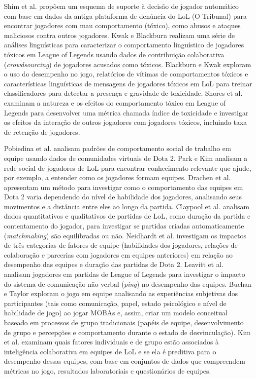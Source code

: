 Shim et al. \cite{shim2014decision} propõem um esquema de suporte à decisão de jogador automático com base em dados da antiga plataforma de denúncia do LoL (O Tribunal) para encontrar jogadores com mau comportamento (tóxico), como abusos e ataques maliciosos contra outros jogadores. Kwak e Blackburn \cite{kwak2014linguistic} realizam uma série de análises linguísticas para caracterizar o comportamento linguístico de jogadores tóxicos em League of Legends usando dados de contribuição colaborativa (\textit{crowdsourcing}) de jogadores acusados como tóxicos. Blackburn e Kwak \cite{blackburn2014stfu} exploram o uso do desempenho no jogo, relatórios de vítimas de comportamentos tóxicos e características linguísticas de mensagens de jogadores tóxicos em LoL para treinar classificadores para detectar a presença e gravidade de toxicidade. Shores et al. \cite{shores2014identification} examinam a natureza e os efeitos do comportamento tóxico em League of Legends para desenvolver uma métrica chamada índice de toxicidade e investigar os efeitos da interação de outros jogadores com jogadores tóxicos, incluindo taxa de retenção de jogadores.

Pobiedina et al. \cite{pobiedina2013ranking} analisam padrões de comportamento social de trabalho em equipe usando dados de comunidades virtuais de Dota 2. Park e Kim \cite{park2014social} analisam a rede social de jogadores de LoL para encontrar conhecimento relevante que ajude, por exemplo, a entender como os jogadores formam equipes. Drachen et al. \cite{drachen2014skill} apresentam um método para investigar como o comportamento das equipes em Dota 2 varia dependendo do nível de habilidade dos jogadores, analisando seus movimentos e a distância entre eles ao longo da partida. Claypool et al. \cite{claypool2015surrender} analisam dados quantitativos e qualitativos de partidas de LoL, como duração da partida e contentamento do jogador, para investigar se partidas criadas automaticamente (\textit{matchmaking}) são equilibradas ou não. Neidhardt et al. \cite{neidhardt2015team} investigam os impactos de três categorias de fatores de equipe (habilidades dos jogadores, relações de colaboração e parcerias com jogadores em equipes anteriores) em relação ao desempenho das equipes e duração das partidas de Dota 2. Leavitt et al. \cite{leavitt2016ping} analisam jogadores em partidas de League of Legends para investigar o impacto do sistema de comunicação não-verbal (\textit{ping}) no desempenho das equipes. Buchan e Taylor \cite{buchan2016qualitative} exploram o jogo em equipe analisando as experiências subjetivas dos participantes (tais como comunicação, papel, estado psicológico e nível de habilidade de jogo) ao jogar MOBAs e, assim, criar um modelo conceitual baseado em processos de grupo tradicionais (papéis de equipe, desenvolvimento de grupo e percepções e comportamento durante o estado de desvinculação). Kim et al. \cite{kim2017makes} examinam quais fatores individuais e de grupo estão associados à inteligência colaborativa em equipes de LoL e se ela é preditiva para o desempenho dessas equipes, com base em conjuntos de dados que compreendem métricas no jogo, resultados laboratoriais e questionários de equipes.


